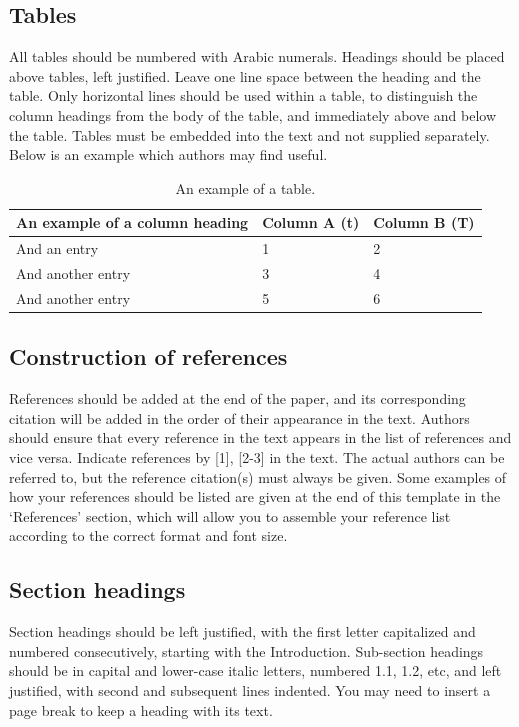 \documentclass[3p,times,procedia]{elsarticle}
\begin{document}
\subsection{ Tables}

All tables should be numbered with Arabic numerals. Headings should be placed above tables, left justified. Leave one line space between the heading and the table. Only horizontal lines should be used within a table, to distinguish the column headings from the body of the table, and immediately above and below the table. Tables must be embedded into the text and not supplied separately. Below is an example which authors may find useful.

\begin{table}[h]
\caption{An example of a table.}
\begin{tabular*}{\hsize}{@{\extracolsep{\fill}}lll@{}}
\hline
An example of a column heading & Column A (t) & Column B (T)\\
\hline
And an entry &   1 &  2\\
And another entry  & 3 &  4\\
And another entry &  5 &  6\\
\hline
\end{tabular*}
\end{table}


\subsection{ Construction of references}

References should be added at the end of the paper, and its corresponding citation will be added in the order of their appearance in the text. Authors should ensure that every reference in the text appears in the list of references and vice versa. Indicate references by [1], [2-3] in the text. The actual authors can be referred to, but the reference citation(s) must always be given. Some examples of how your references should be listed are given at the end of this template in the `References' section, which will allow you to assemble your reference list according to the correct format and font size.

\subsection{Section headings}
Section headings should be left justified, with the first letter capitalized and numbered consecutively, starting with the Introduction. Sub-section headings should be in capital and lower-case italic letters, numbered 1.1, 1.2, etc, and left justified, with second and subsequent lines indented. You may need to insert a page break to keep a heading with its text.
\end{document}

